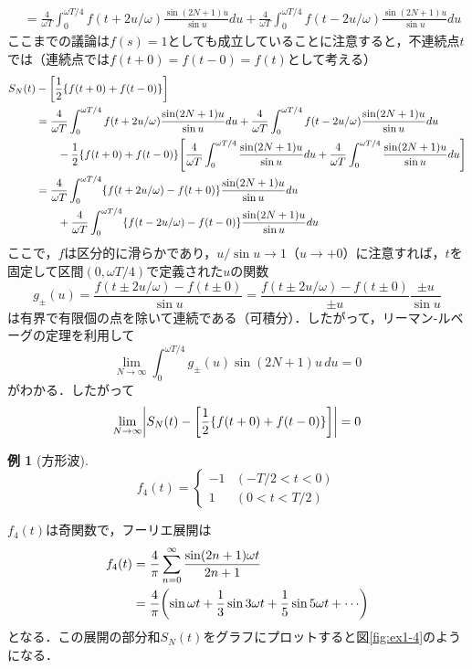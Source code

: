 \documentclass[dvipdfmx,a4j,10pt]{jsarticle}
\makeatletter
\theoremstyle{mystyle1}
\theoremstyle{mystyle3}
\newtheorem{example}{例}[section]
\theoremstyle{mystyle4}
\theoremstyle{mystyle6}
\theoremstyle{mystyle2}
\theoremstyle{mystyle5}
\renewenvironment{proof}[1][\proofname]{\par
  \pushQED{\qed}%
  \normalfont
  \topsep6\p@\@plus6\p@ \trivlist
  \item[\hskip\labelsep{\bfseries\sffamily #1}]\ignorespaces
}{%
  \popQED\endtrivlist\@endpefalse
}
\renewcommand\proofname{証明}
\newenvironment{ex}[1][]
{\begin{tcolorbox}[
    enhanced,
    boxrule=0pt,
    arc=0mm,
    frame hidden,
    borderline west={0.25pt}{-4pt}{black},
    borderline west={0.25pt}{-2.25pt}{black},
    breakable = true
    ]
    \begin{example}[#1]
}
{\end{example}\end{tcolorbox}}
\makeatother
\begin{document}
\begin{proof}
\[\begin{split}
			&= \frac{4}{\omega T}\int_0^{\omega T/4} f(t+2u/\omega)\frac{\sin(2N+1)u}{\sin u}du
			+\frac{4}{\omega T}\int_0^{\omega T/4} f(t-2u/\omega)\frac{\sin(2N+1)u}{\sin u}du
		\end{split}
	\]
	ここまでの議論は$f(s)=1$としても成立していることに注意すると，不連続点$t$では（連続点では$f(t+0)=f(t-0)=f(t)$として考える）
	\[
		\begin{split}
			S_N(t)&-\mleft[\frac{1}{2}\{f(t+0)+f(t-0)\}\mright] \\
			&=\frac{4}{\omega T}\int_0^{\omega T/4} f(t+2u/\omega)\frac{\sin(2N+1)u}{\sin u}du
			+\frac{4}{\omega T}\int_0^{\omega T/4} f(t-2u/\omega)\frac{\sin(2N+1)u}{\sin u}du \\
			& \qquad -\frac{1}{2}\{f(t+0)+f(t-0)\}\mleft[\frac{4}{\omega T}\int_0^{\omega T/4} \frac{\sin(2N+1)u}{\sin u}du
				+\frac{4}{\omega T}\int_0^{\omega T/4} \frac{\sin(2N+1)u}{\sin u}du\mright] \\
			&= \frac{4}{\omega T}\int_0^{\omega T/4} \{f(t+2u/\omega)-f(t+0)\}\frac{\sin(2N+1)u}{\sin u}du \\
			& \qquad +\frac{4}{\omega T}\int_0^{\omega T/4} \{f(t-2u/\omega)-f(t-0)\}\frac{\sin(2N+1)u}{\sin u}du
		\end{split}
	\]
	ここで，$f$は区分的に滑らかであり，$u/\sin u\to 1$（$u\to +0$）に注意すれば，$t$を固定して区間$(0,\omega T/4)$で定義された$u$の関数
	\[
		g_\pm(u)=\frac{f(t\pm 2u/\omega)-f(t\pm 0)}{\sin u}=\frac{f(t\pm 2u/\omega)-f(t\pm 0)}{\pm u}\frac{\pm u}{\sin u}
	\]
	は有界で有限個の点を除いて連続である（可積分）．したがって，リーマン-ルベーグの定理を利用して
	\[
		\lim_{N\to\infty}\int_0^{\omega T/4}g_\pm(u)\sin(2N+1)u\, du=0
	\]
	がわかる．したがって
	\[
		\lim_{N\to\infty}\mleft|S_N(t)-\mleft[\frac{1}{2}\{f(t+0)+f(t-0)\}\mright]\mright|=0
	\]
\end{proof}

\begin{ex}[方形波]
	\[
		f_4(t)=\begin{cases}
			-1 & (-T/2<t<0) \\
			1  & (0<t<T/2)
		\end{cases}
	\]
\end{ex}

$f_4(t)$は奇関数で，フーリエ展開は
\[
	\begin{split}
		f_4(t)
		&=\frac{4}{\pi}\sum_{n=0}^\infty \frac{\sin(2n+1)\omega t}{2n+1} \\
		&=\frac{4}{\pi}\mleft(\sin\omega t+\frac{1}{3}\sin3\omega t+\frac{1}{5}\sin5\omega t+\cdots\mright)
	\end{split}
\]
となる．この展開の部分和$S_N(t)$をグラフにプロットすると図\ref{fig:ex1-4}のようになる．
\end{document}
